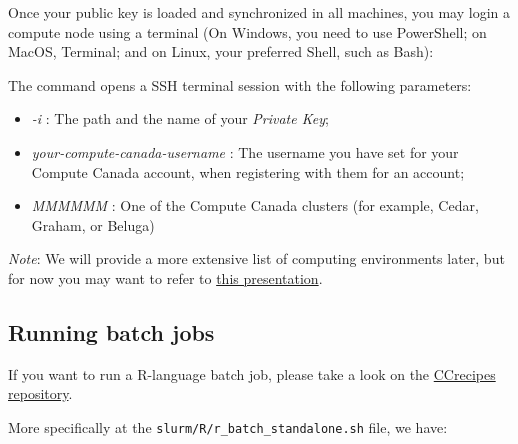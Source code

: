 \documentclass[
]{book}
\newenvironment{Shaded}{\begin{snugshade}}{\end{snugshade}}
\newcommand{\AttributeTok}[1]{\textcolor[rgb]{0.77,0.63,0.00}{#1}}
\newcommand{\ExtensionTok}[1]{#1}
\newcommand{\NormalTok}[1]{#1}
\providecommand{\tightlist}{%
  \setlength{\itemsep}{0pt}\setlength{\parskip}{0pt}}
\begin{document}
Once your public key is loaded and synchronized in all machines, you may login a compute node using a terminal (On Windows, you need to use PowerShell; on MacOS, Terminal; and on Linux, your preferred Shell, such as Bash):

\begin{Shaded}
\end{Shaded}

The command opens a SSH terminal session with the following parameters:

\begin{itemize}
\tightlist
\item
  \emph{-i} : The path and the name of your \emph{Private Key};
\item
  \emph{your-compute-canada-username} : The username you have set for your Compute Canada account, when registering with them for an account;
\item
  \emph{MMMMMM} : One of the Compute Canada clusters (for example, Cedar, Graham, or Beluga)
\end{itemize}

\emph{Note}: We will provide a more extensive list of computing environments later, but for now you may want to refer to \href{http://bit.ly/introhpc}{this presentation}.

\hypertarget{running-batch-jobs}{%
\subsection{Running batch jobs}\label{running-batch-jobs}}

If you want to run a R-language batch job, please take a look on the
\href{https://github.com/ricardobarroslourenco/CCrecipes}{CCrecipes repository}.

More specifically at the \texttt{slurm/R/r\_batch\_standalone.sh} file, we have:
\end{document}
